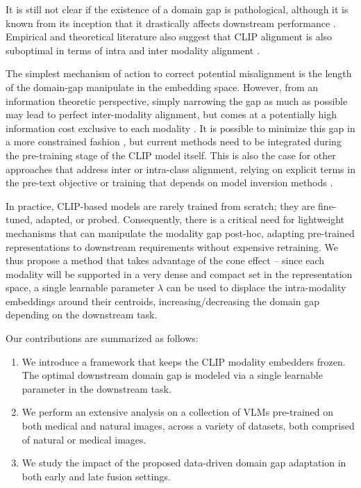 \documentclass[runningheads]{llncs}
\begin{document}
It is still not clear if the existence of a domain gap is pathological, although it is known from its inception that it drastically affects downstream performance \cite{liang2022mind}. Empirical and theoretical literature also suggest that CLIP alignment is also suboptimal in terms of intra and inter modality alignment \cite{liang2022mind,shi2023towards,zhang2023diagnosing,schrodi2024two,lee2025diffusion,mistretta2025cross}.

The simplest mechanism of action to correct potential misalignment is the length of the domain-gap manipulate in the embedding space. However, from an information theoretic perspective, simply narrowing the gap as much as possible may lead to perfect inter-modality alignment, but comes at a potentially high information cost exclusive to each modality \cite{jiang2023understanding}. It is possible to minimize this gap in a more constrained fashion \cite{shi2023towards,hu2024reclip,eslami2024mitigate}, but current methods need to be integrated during the pre-training stage of the CLIP model itself. This is also the case for other approaches that address inter or intra-class alignment, relying on explicit terms in the pre-text objective \cite{jiang2023understanding,mistretta2025cross} or training that depends on model inversion methods \cite{huang2025mind,lee2025diffusion}.  

In practice, CLIP-based models are rarely trained from scratch; they are fine-tuned, adapted, or probed. Consequently, there is a critical need for lightweight mechanisms that can manipulate the modality gap post-hoc, adapting pre-trained representations to downstream requirements without expensive retraining. We thus propose a method that takes advantage of the cone effect -- since each modality will be supported in a very dense and compact set in the representation space, a single learnable parameter $\lambda$ can be used to displace the intra-modality embeddings around their centroids, increasing/decreasing the domain gap depending on the downstream task. 

Our contributions are summarized as follows:
\begin{enumerate}
\item We introduce a framework that keeps the CLIP modality embedders frozen. The optimal downstream domain gap is modeled via a single learnable parameter in the downstream task.
\item We perform an extensive analysis on a collection of VLMs pre-trained on both medical and natural images, across a variety of datasets, both comprised of natural or medical images.
\item We study the impact of the proposed data-driven domain gap adaptation in both early and late fusion settings.
\end{enumerate}
\end{document}
